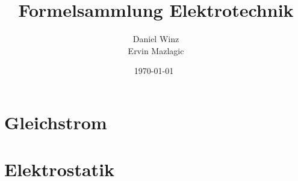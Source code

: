\documentclass[a5paper,10pt,fleqn]{book}
\title{Formelsammlung Elektrotechnik}
\author{Daniel Winz\\Ervin Mazlagic}
\date{\today~\dtc}
\begin{document}
\maketitle



\tableofcontents

\chapter{Gleichstrom}


\chapter{Elektrostatik}

\end{document}

